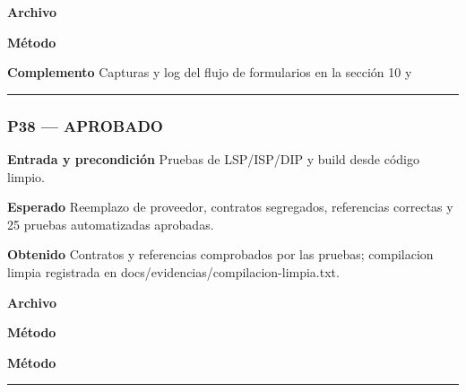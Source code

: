 \textbf{Archivo} \href{https://github.com/Alan77-bot/LogiMarket360Alan/blob/68bda51063441415524ede51bdf61649ee9b4973/tests/LogiMarket.Tests/Integracion/OutboxTests.cs}{}

\textbf{Método} 

\textbf{Complemento} Capturas y log del flujo de formularios en la sección 10 y 

\medskip\hrule\medskip
\subsubsection*{P38 --- APROBADO}
\textbf{Entrada y precondición} Pruebas de LSP/ISP/DIP y build desde código limpio.

\textbf{Esperado} Reemplazo de proveedor, contratos segregados, referencias correctas y 25 pruebas automatizadas aprobadas.

\textbf{Obtenido} Contratos y referencias comprobados por las pruebas; compilacion limpia registrada en docs/evidencias/compilacion-limpia.txt.

\textbf{Archivo} \href{https://github.com/Alan77-bot/LogiMarket360Alan/blob/68bda51063441415524ede51bdf61649ee9b4973/tests/LogiMarket.Tests/Arquitectura/DependenciasTests.cs}{}

\textbf{Método} 

\textbf{Método} 

\medskip\hrule\medskip
